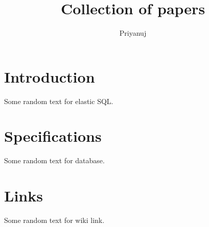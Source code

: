 \documentclass{article}
\title{Collection of papers}
\author{Priyanuj}
\date{}
\begin{document}
	
	\maketitle
	\section{Introduction}
	Some random text for elastic SQL. \cite{Tatemura} \lipsum[1-2]
	
	\section{Specifications}
	Some random text for database. \cite{ullman} \lipsum[1-2]
	
	\section{Links}
	Some random text for wiki link. \cite{wiki} \lipsum[1-2]
	
	
	
\end{document}
